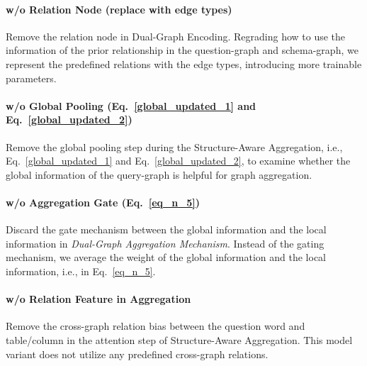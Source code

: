 \documentclass{article}
\begin{document}
\paragraph{w/o Relation Node (replace with edge types)}
Remove the relation node in Dual-Graph Encoding. 
Regrading how to use the information of the prior relationship in the question-graph and schema-graph, we represent the predefined relations with the edge types, introducing more trainable parameters.

\paragraph{w/o Global Pooling (Eq.~\ref{global_updated_1} and Eq.~\ref{global_updated_2})}
Remove the global pooling step during the Structure-Aware Aggregation, i.e., Eq.~\ref{global_updated_1} and Eq.~\ref{global_updated_2}, to examine whether the global information of the query-graph is helpful for graph aggregation.

\paragraph{w/o Aggregation Gate (Eq.~\ref{eq_n_5})}
Discard the gate mechanism between the global information and the local information in \emph{Dual-Graph Aggregation Mechanism}.
Instead of the gating mechanism, we average the weight of the global information and the local information, i.e.,  in Eq.~\ref{eq_n_5}.

\paragraph{w/o Relation Feature in Aggregation }
Remove the cross-graph relation bias between the question word and table/column in the attention step of Structure-Aware Aggregation. 
This model variant does not utilize any predefined cross-graph relations.
\end{document}
